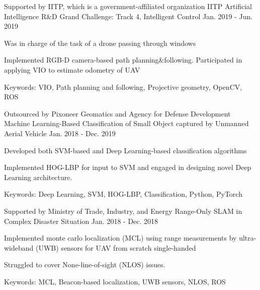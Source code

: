 \begin{cventries}
    \cventry
      {Supported by IITP, which is a government-affiliated organization} %
      {IITP Artificial Intelligence R\&D Grand Challenge: Track 4, Intelligent Control} %
      {\urban} %
      {Jan. 2019 - Jun. 2019} %
      {
        \begin{cvitems} %
          \item Was in charge of the task of a drone passing through windows
          \item Implemented RGB-D camera-based path planning\&following. Participated in applying VIO to estimate odometry of UAV
          \item Keywords: VIO, Path planning and following, Projective geometry, OpenCV, ROS
        \end{cvitems}
      }

    \cventry
      {Outsourced by Pixoneer Geomatics and Agency for Defense Development} %
      {Machine Learning-Based Classification of Small Object captured by Unmanned Aerial Vehicle} %
      {\urban} %
      {Jan. 2018 - Dec. 2019} %
      {
        \begin{cvitems} %
          \item Developed both SVM-based and Deep Learning-based classification algorithms
          \item Implemented HOG-LBP for input to SVM and engaged in designing novel Deep Learning architecture.
          \item Keywords: Deep Learning, SVM, HOG-LBP, Classification, Python, PyTorch
        \end{cvitems}
      }

    \cventry
      {Supported by Ministry of Trade, Industry, and Energy} %
      {Range-Only SLAM in Complex Disaster Situation} %
      {\urban} %
      {Jan. 2018 - Dec. 2018} %
      {
        \begin{cvitems} %
          \item Implemented monte carlo localization (MCL) using range measurements by ultra-wideband (UWB) sensors for UAV from scratch single-handed
          \item Struggled to cover None-line-of-sight (NLOS) issues.
          \item Keywords: MCL, Beacon-based localization, UWB sensors, NLOS, ROS
        \end{cvitems}
      }

\end{cventries}
